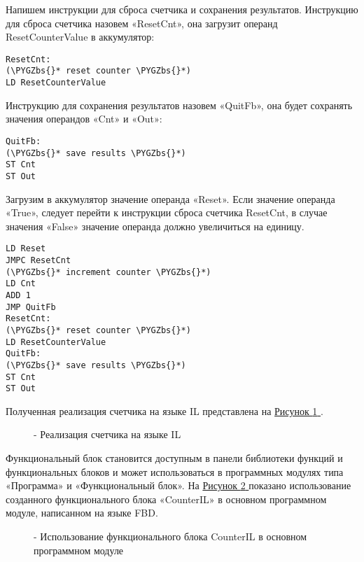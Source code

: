 \documentclass[letterpaper,10pt,russian]{sphinxmanual}
\def\PYGZbs{\char`\\}
\begin{document}
Напишем инструкции для сброса счетчика и сохранения результатов.
Инструкцию для сброса счетчика назовем «ResetCnt», она загрузит операнд
ResetCounterValue в аккумулятор:

\begin{Verbatim}[commandchars=\\\{\}]
ResetCnt:
(\PYGZbs{}* reset counter \PYGZbs{}*)
LD ResetCounterValue
\end{Verbatim}

Инструкцию для сохранения результатов назовем «QuitFb», она будет
сохранять значения операндов «Cnt» и «Out»:

\begin{Verbatim}[commandchars=\\\{\}]
QuitFb:
(\PYGZbs{}* save results \PYGZbs{}*)
ST Cnt
ST Out
\end{Verbatim}

Загрузим в аккумулятор значение операнда «Reset». Если значение операнда
«True», следует перейти к инструкции сброса счетчика ResetCnt, в случае
значения «False» значение операнда должно увеличиться на единицу.

\begin{Verbatim}[commandchars=\\\{\}]
LD Reset
JMPC ResetCnt
(\PYGZbs{}* increment counter \PYGZbs{}*)
LD Cnt
ADD 1
JMP QuitFb
ResetCnt:
(\PYGZbs{}* reset counter \PYGZbs{}*)
LD ResetCounterValue
QuitFb:
(\PYGZbs{}* save results \PYGZbs{}*)
ST Cnt
ST Out
\end{Verbatim}

Полученная реализация счетчика на языке IL представлена на \hyperref[usage_guide/work_with_project:image181]{Рисунок \ref{usage_guide/work_with_project:image181} }.
\begin{figure}[htbp]
\centering
\capstart

\noindent{}
\caption{- Реализация счетчика на языке IL}\label{usage_guide/work_with_project:image181}\end{figure}

Функциональный блок становится доступным в панели библиотеки функций и
функциональных блоков  и может использоваться в программных
модулях типа «Программа» и «Функциональный блок». На \hyperref[usage_guide/work_with_project:image182]{Рисунок \ref{usage_guide/work_with_project:image182} } показано
использование созданного функционального блока «CounterIL» в основном
программном модуле, написанном на языке FBD.
\begin{figure}[htbp]
\centering
\capstart

\noindent{}
\caption{- Использование функционального блока CounterIL в основном программном модуле}\label{usage_guide/work_with_project:image182}\end{figure}
\end{document}

